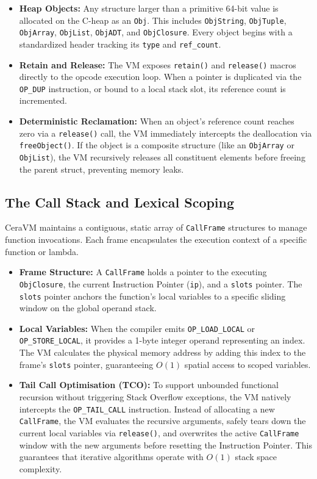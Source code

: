 \documentclass[11pt, a4paper]{article}
\begin{document}
\begin{itemize}
    \item \textbf{Heap Objects:} Any structure larger than a primitive 64-bit value is allocated on the C-heap as an \texttt{Obj}. This includes \texttt{ObjString}, \texttt{ObjTuple}, \texttt{ObjArray}, \texttt{ObjList}, \texttt{ObjADT}, and \texttt{ObjClosure}. Every object begins with a standardized header tracking its \texttt{type} and \texttt{ref\_count}.
    \item \textbf{Retain and Release:} The VM exposes \texttt{retain()} and \texttt{release()} macros directly to the opcode execution loop. When a pointer is duplicated via the \texttt{OP\_DUP} instruction, or bound to a local stack slot, its reference count is incremented. 
    \item \textbf{Deterministic Reclamation:} When an object's reference count reaches zero via a \texttt{release()} call, the VM immediately intercepts the deallocation via \texttt{freeObject()}. If the object is a composite structure (like an \texttt{ObjArray} or \texttt{ObjList}), the VM recursively releases all constituent elements before freeing the parent struct, preventing memory leaks.
\end{itemize}

\subsection{The Call Stack and Lexical Scoping}
\noindent
CeraVM maintains a contiguous, static array of \texttt{CallFrame} structures to manage function invocations. Each frame encapsulates the execution context of a specific function or lambda.

\begin{itemize}
    \item \textbf{Frame Structure:} A \texttt{CallFrame} holds a pointer to the executing \texttt{ObjClosure}, the current Instruction Pointer (\texttt{ip}), and a \texttt{slots} pointer. The \texttt{slots} pointer anchors the function's local variables to a specific sliding window on the global operand stack.
    \item \textbf{Local Variables:} When the compiler emits \texttt{OP\_LOAD\_LOCAL} or \texttt{OP\_STORE\_LOCAL}, it provides a 1-byte integer operand representing an index. The VM calculates the physical memory address by adding this index to the frame's \texttt{slots} pointer, guaranteeing $O(1)$ spatial access to scoped variables.
    \item \textbf{Tail Call Optimisation (TCO):} To support unbounded functional recursion without triggering Stack Overflow exceptions, the VM natively intercepts the \texttt{OP\_TAIL\_CALL} instruction. Instead of allocating a new \texttt{CallFrame}, the VM evaluates the recursive arguments, safely tears down the current local variables via \texttt{release()}, and overwrites the active \texttt{CallFrame} window with the new arguments before resetting the Instruction Pointer. This guarantees that iterative algorithms operate with $O(1)$ stack space complexity.
\end{itemize}
\end{document}
